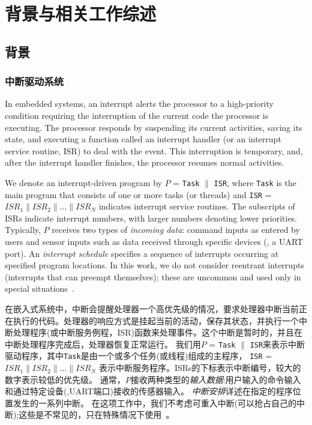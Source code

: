 
\chapter{背景与相关工作综述}\label{sec:related}

\section{背景}\label{sec:related:frame}

\subsection{中断驱动系统}\label{sec:related:idrace}
In embedded systems, an interrupt alerts the processor to a high-priority condition requiring
the interruption of the current code the processor is executing.
The processor responds by suspending its current activities, saving its state,
and executing a function called an interrupt handler (or an interrupt service routine, ISR)
to deal with the event. This interruption is temporary, and, after the interrupt handler
finishes, the processor resumes normal activities.

We denote an interrupt-driven program by
$P$ = {\tt Task} $\|$ {\tt ISR},
where {\tt Task} is the main program that consists
of one or more tasks (or threads) and
{\tt ISR} = $ISR_1 \| ISR_2 \| \ldots \| ISR_N$
indicates interrupt service routines. The
subscripts of ISRs indicate interrupt numbers,
with larger numbers denoting lower priorities.
Typically, $P$ receives two types of \emph{incoming data}:
command inputs as entered by users
and sensor inputs such as data received
through specific devices (\eg, a UART port).
An \emph{interrupt schedule} specifies a sequence
of interrupts occurring at specified program locations.
In this work, we do not consider reentrant interrupts
(interrupts that can preempt themselves); these are uncommon
and used only in special situations~\cite{Regehr05}.

在嵌入式系统中，中断会提醒处理器一个高优先级的情况，要求处理器中断当前正在执行的代码。处理器的响应方式是挂起当前的活动，保存其状态，并执行一个中断处理程序(或中断服务例程，ISR)函数来处理事件。这个中断是暂时的，并且在中断处理程序完成后，处理器恢复正常运行。
我们用$P$ = {\tt Task} $\|$ {\tt ISR}来表示中断驱动程序，其中{\tt Task}是由一个或多个任务(或线程)组成的主程序，
{\tt ISR} = $ISR_1 \| ISR_2 \| \ldots \| ISR_N$
表示中断服务程序。ISRs的下标表示中断编号，较大的数字表示较低的优先级。
通常，$P$接收两种类型的\emph{输入数据}:用户输入的命令输入和通过特定设备(\eg,UART端口)接收的传感器输入。
\emph{中断安排}详述在指定的程序位置发生的一系列中断。 
在这项工作中，我们不考虑可重入中断(可以抢占自己的中断);这些是不常见的，只在特殊情况下使用~\cite{Regehr05}。

